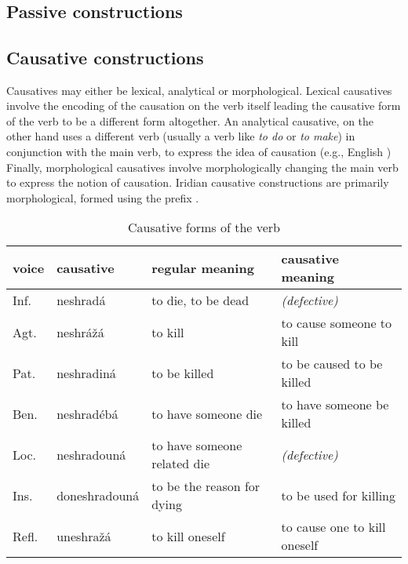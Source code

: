\pex{}
\\
\\
\\
\\
\\
\\
\xe



\subsection{Passive constructions}


\subsection{Causative constructions}

Causatives may either be lexical, analytical or morphological. Lexical
causatives involve the encoding of the causation on the verb itself leading the
causative form of the verb to be a different form altogether. An analytical
causative, on the other hand uses a different verb (usually a verb like \emph{to
do} or \emph{to make}) in conjunction with the main verb, to express the idea of
causation (e.g., English )
Finally, morphological causatives involve morphologically changing the main verb
to express the notion of causation. Iridian causative constructions are
primarily morphological, formed using the prefix .

\begin{table}
\footnotesize\sffamily
\caption{Causative forms of the verb }
\medskip
	\label{tbl:causative}
    \begin{tabu}to 
        \toprule
		 		{\sc voice}& {\sc causative } &{\sc regular meaning} & {\sc causative meaning}\\
		\midrule
				Inf.				& neshradá									& to die, to be dead 	& \emph{(defective)} \\ 
		 		Agt.				& {neshrážá}			& to kill & to cause someone to kill\\ 
		 		Pat.			& {neshradiná}					& to be killed & to be caused to be killed\\
				Ben.			& {neshradébá}				& to have someone die	& to have someone be killed\\
				Loc.				& {neshradouná}					& to have someone related die&\emph{(defective)}\\
				Ins.		& {doneshradouná}&to be the reason for dying&to be used for killing\\
				Refl.				& {uneshražá}&to kill oneself&to cause one to kill oneself\\
		 		
				\bottomrule

    \end{tabu}

\end{table}

